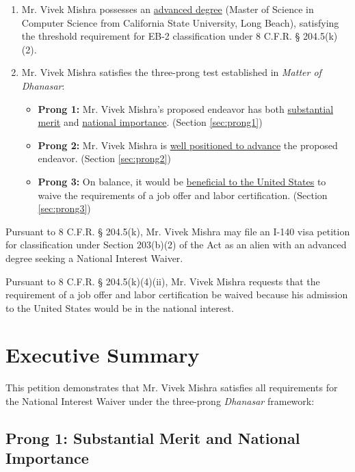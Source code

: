\documentclass[11pt]{article}
\newcommand{\dr}{Mr. Vivek Mishra }
\newcommand{\drs}{Mr. Vivek Mishra's }
\begin{document}
\begin{enumerate}
 \item \dr possesses an \underline{advanced degree} (Master of Science in Computer Science from California State University, Long Beach), satisfying the threshold requirement for EB-2 classification under 8 C.F.R. § 204.5(k)(2).
 
 \item \dr satisfies the three-prong test established in \textit{Matter of Dhanasar}:
 \begin{itemize}
  \item \textbf{Prong 1:} \drs proposed endeavor has both \underline{substantial merit} and \underline{national importance}. (Section \ref{sec:prong1})
  \item \textbf{Prong 2:} \dr is \underline{well positioned to advance} the proposed endeavor. (Section \ref{sec:prong2})
  \item \textbf{Prong 3:} On balance, it would be \underline{beneficial to the United States} to waive the requirements of a job offer and labor certification. (Section \ref{sec:prong3})
 \end{itemize}
\end{enumerate}

Pursuant to 8 C.F.R. § 204.5(k), \dr may file an I-140 visa petition for classification under Section 203(b)(2) of the Act as an alien with an advanced degree seeking a National Interest Waiver.

Pursuant to 8 C.F.R. § 204.5(k)(4)(ii), \dr requests that the requirement of a job offer and labor certification be waived because his admission to the United States would be in the national interest.

\vspace{1em}


\section{Executive Summary}

This petition demonstrates that \dr satisfies all requirements for the National Interest Waiver under the three-prong \textit{Dhanasar} framework:

\subsection{Prong 1: Substantial Merit and National Importance}
\end{document}
